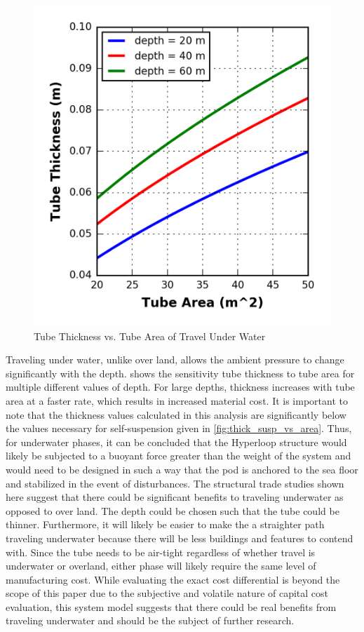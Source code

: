 \begin{figure}
	\centering
	\includegraphics{../../images/graphs/underwater_structural_trades/tube_area_vs_depth.png}
	\caption{Tube Thickness vs. Tube Area of Travel Under Water}
	\label{fig:tube_thick_vs_tube_area_underwater}
\end{figure}

Traveling under water, unlike over land, allows the ambient pressure to change significantly with the depth.  shows the sensitivity tube thickness to tube area for multiple different values of depth. For large depths, thickness increases with tube area at a faster rate, which results in increased material cost. It is important to note that the thickness values calculated in this analysis are significantly below the values necessary for self-suspension given in \cref{fig:thick_susp_vs_area}. Thus, for underwater phases, it can be concluded that the Hyperloop structure would likely be subjected to a buoyant force greater than the weight of the system and would need to be designed in such a way that the pod is anchored to the sea floor and stabilized in the event of disturbances.
The structural trade studies shown here suggest that there could be significant benefits to traveling underwater as opposed to over land. The depth could be chosen such that the tube could be thinner. Furthermore, it will likely be easier to make the a straighter path traveling underwater because there will be less buildings and features to contend with. Since the tube needs to be air-tight regardless of whether travel is underwater or overland, either phase will likely require the same level of manufacturing cost. While evaluating the exact cost differential is beyond the scope of this paper due to the subjective and volatile nature of capital cost evaluation, this system model suggests that there could be real benefits from traveling underwater and should be the subject of further research.
